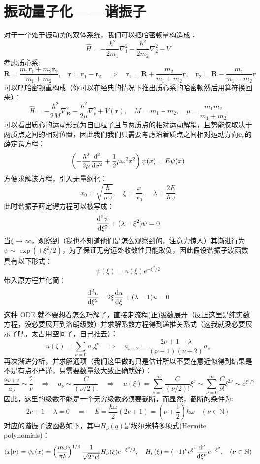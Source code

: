 \section{振动量子化——谐振子}
对于一个处于振动势的双体系统，我们可以把哈密顿量构造成：
\[\hat{H}=-\frac{\hbar^2}{2m_1}\nabla^2_1-\frac{\hbar^2}{2m_2}\nabla^2_2+V\]
考虑质心系:
\[\bm{R}=\frac{m_1\bm{r}_1+m_2\bm{r}_2}{m_1+m_2}, \quad \bm{r}=\bm{r}_1-\bm{r}_2 \quad \Rightarrow \quad \bm{r}_1=\bm{R}+\frac{m_2}{m_1+m_2}\bm{r}, \quad \bm{r}_2=\bm{R}-\frac{m_1}{m_1+m_2}\bm{r}\]
可以吧哈密顿重构成（你可以在经典的情况下推出质心系的哈密顿然后用算符换回来）：
\[\hat{H}=-\frac{\hbar^2}{2M}\nabla^2_{\bm{R}}-\frac{\hbar^2}{2\mu}\nabla^2_{\bm{r}}+V(\bm{r}), \quad M=m_1+m_2, \quad \mu=\frac{m_1m_2}{m_1+m_2}\]
可以看出质心的运动形式为自由粒子且与两质点的相对运动解耦，且势能仅取决于两质点之间的相对位置，因此我们我们只需要考虑沿着质点之间相对运动方向$\mathbf{e}_{\bm{r}}$的薛定谔方程：
\[\left(-\frac{\hbar^2}{2\mu}\dv[2]{x}+\frac{1}{2}\mu\omega^2x^2\right)\psi(x)=E\psi(x)\]
方便求解该方程，引入无量纲化：
\[x_0=\sqrt{\frac{\hbar}{\mu\omega}}, \quad \xi=\frac{x}{x_0}, \quad \lambda=\frac{2E}{\hbar\omega}\]
此时谐振子薛定谔方程可以被写成：
\[\dv[2]{\psi}{\xi}+(\lambda-\xi^2)\psi=0\]
当$\xi\to\infty$，观察到（我也不知道他们是怎么观察到的，注意力惊人）其渐进行为$\psi\sim\exp(\pm\xi^2/2)$，为了保证无穷远处收敛性只能取负，因此假设谐振子波函数具有以下形式：
\[\psi(\xi)=u(\xi)e^{-\xi^2/2}\]
带入原方程并化简：
\[\dv[2]{u}{\xi}-2\xi\dv{u}{\xi}+(\lambda-1)u=0\]
这种 ODE 就不要想着怎么巧解了，直接走流程(正)级数展开（反正这里是纯实数方程，没必要展开到洛朗级数）并求解系数方程得到递推关系式（这我就没必要展示了吧，太占用空间了，自己推去）：
\[u(\xi)=\sum_{\nu=0}a_{\nu}\xi^{\nu} \quad \Rightarrow \quad a_{\nu+2}=\frac{2\nu+1-\lambda}{(\nu+1)(\nu+2)}a_{\nu}\]
再次渐进分析，并求解通项（我们这里做的只是估计所以不要在意近似得到结果是不是有点不严谨，只需要数量级大致正确就好）：
\[\frac{a_{\nu+2}}{a_{\nu}}\sim\frac{2}{\nu} \quad \Rightarrow \quad {a_{\nu}}\sim\frac{C}{(\nu/2)!} \quad \Rightarrow \quad u(\xi)=\sum_{\nu=0}^{\infty}\frac{C}{(\nu/2)!}\xi^{\nu}\sim\sum_{\nu=0}^{\infty}\frac{C}{\nu!}\xi^{2\nu}\sim e^{\xi^2/2}\]
因此，这里的级数不能是一个无穷级数必须要截断，而显然，截断的条件为:
\[2\nu+1-\lambda=0 \quad \Rightarrow \quad E=\frac{\hbar\omega}{2}(2\nu+1)=(\nu+\frac{1}{2})\hbar\omega \quad (\nu \in \mathbb{N})\]
对应的谐振子波函数如下，其中$H_{\nu}(q)$是埃尔米特多项式(Hermite polynomials)：
\[\bra{x}\ket{\nu}=\psi_{\nu}(x)=\left(\frac{m\omega}{\pi\hbar}\right)^{1/4}\frac{1}{\sqrt{2^{\nu}\nu!}}H_{\nu}(\xi)e^{-\xi^2/2}, \quad H_{\nu}(\xi)=(-1)^{\nu}e^{\xi^2}\dv[\nu]{\xi}e^{-\xi^2}, \quad (\nu \in \mathbb{N})\]

